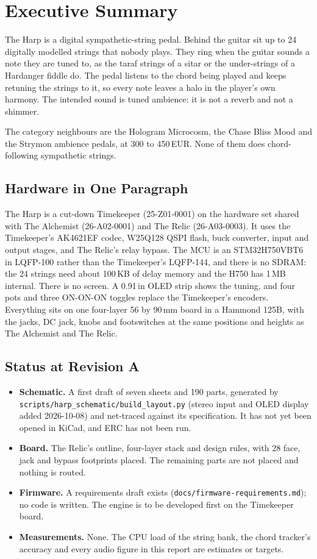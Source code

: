 \chapter{Executive Summary}\label{ch:summary}

The Harp is a digital sympathetic-string pedal. Behind the guitar sit up to 24 digitally modelled strings that nobody plays. They ring when the guitar sounds a note they are tuned to, as the taraf strings of a sitar or the under-strings of a Hardanger fiddle do. The pedal listens to the chord being played and keeps retuning the strings to it, so every note leaves a halo in the player's own harmony. The intended sound is tuned ambience: it is not a reverb and not a shimmer.

The category neighbours are the Hologram Microcosm, the Chase Bliss Mood and the Strymon ambience pedals, at 300 to 450\,EUR. None of them does chord-following sympathetic strings.

\section{Hardware in One Paragraph}
The Harp is a cut-down Timekeeper (25-Z01-0001) on the hardware set shared with The Alchemist (26-A02-0001) and The Relic (26-A03-0003). It uses the Timekeeper's AK4621EF codec, W25Q128 QSPI flash, buck converter, input and output stages, and The Relic's relay bypass. The MCU is an STM32H750VBT6 in LQFP-100 rather than the Timekeeper's LQFP-144, and there is no SDRAM: the 24 strings need about 100\,KB of delay memory and the H750 has 1\,MB internal. There is no screen. A 0.91\,in OLED strip shows the tuning, and four pots and three ON-ON-ON toggles replace the Timekeeper's encoders. Everything sits on one four-layer 56 by 90\,mm board in a Hammond 125B, with the jacks, DC jack, knobs and footswitches at the same positions and heights as The Alchemist and The Relic.

\section{Status at Revision A}
\begin{itemize}
  \item \textbf{Schematic.} A first draft of seven sheets and 190 parts, generated by \texttt{scripts/harp\_schematic/build\_layout.py} (stereo input and OLED display added 2026-10-08) and net-traced against its specification. It has not yet been opened in KiCad, and ERC has not been run.
  \item \textbf{Board.} The Relic's outline, four-layer stack and design rules, with 28 face, jack and bypass footprints placed. The remaining parts are not placed and nothing is routed.
  \item \textbf{Firmware.} A requirements draft exists (\texttt{docs/firmware-requirements.md}); no code is written. The engine is to be developed first on the Timekeeper board.
  \item \textbf{Measurements.} None. The CPU load of the string bank, the chord tracker's accuracy and every audio figure in this report are estimates or targets.
\end{itemize}


